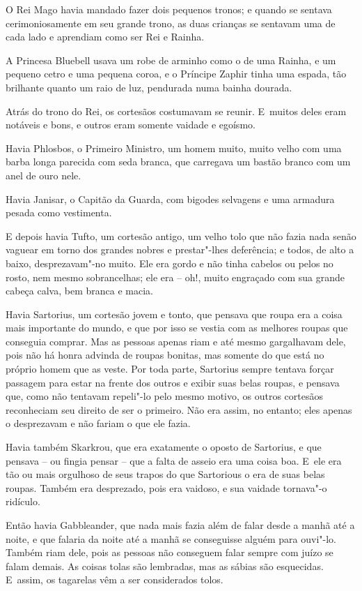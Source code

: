 O Rei Mago havia mandado fazer dois pequenos tronos; e quando se
sentava cerimoniosamente em seu grande trono, as duas crianças se
sentavam uma de cada lado e aprendiam como ser Rei e Rainha.

A Princesa Bluebell usava um robe de arminho como o de uma Rainha, e um
pequeno cetro e uma pequena coroa, e o Príncipe Zaphir tinha uma espada,
tão brilhante quanto um raio de luz, pendurada numa bainha dourada.

Atrás do trono do Rei, os cortesãos costumavam se reunir. E~muitos deles
eram notáveis e bons, e outros eram somente vaidade e egoísmo.

Havia Phlosbos, o Primeiro Ministro, um homem muito, muito velho com uma
barba longa parecida com seda branca, que carregava um bastão branco com
um anel de ouro nele.

Havia Janisar, o Capitão da Guarda, com bigodes selvagens e uma armadura
pesada como vestimenta.

E depois havia Tufto, um cortesão antigo, um velho tolo que não fazia
nada senão vaguear em torno dos grandes nobres e prestar"-lhes
deferência; e todos, de alto a baixo, desprezavam"-no muito. Ele era
gordo e não tinha cabelos ou pelos no rosto, nem mesmo sobrancelhas; ele
era -- oh!, muito engraçado com sua grande cabeça calva, bem branca e
macia.

Havia Sartorius, um cortesão jovem e tonto, que pensava que roupa era a
coisa mais importante do mundo, e que por isso se vestia com as melhores
roupas que conseguia comprar. Mas as pessoas apenas riam e até mesmo
gargalhavam dele, pois não há honra advinda de roupas bonitas, mas somente do
que está no próprio homem que as veste. Por toda parte, Sartorius sempre
tentava forçar passagem para estar na frente dos outros e exibir suas
belas roupas, e pensava que, como não tentavam repeli"-lo pelo mesmo
motivo, os outros cortesãos reconheciam seu direito de ser o primeiro.
Não era assim, no entanto; eles apenas o desprezavam e não fariam o que
ele fazia.

Havia também Skarkrou, que era exatamente o oposto de Sartorius, e que
pensava -- ou fingia pensar -- que a falta de asseio era uma coisa boa.
E~ele era tão ou mais orgulhoso de seus trapos do que Sartorious o era
de suas belas roupas. Também era desprezado, pois era vaidoso, e sua
vaidade tornava"-o ridículo.

Então havia Gabbleander, que nada mais fazia além de falar desde a manhã
até a noite, e que falaria da noite até a manhã se conseguisse alguém
para ouvi"-lo. Também riam dele, pois as pessoas não conseguem falar
sempre com juízo se falam demais. As coisas tolas são lembradas, mas as
sábias são esquecidas. E~assim, os tagarelas vêm a ser considerados
tolos.

